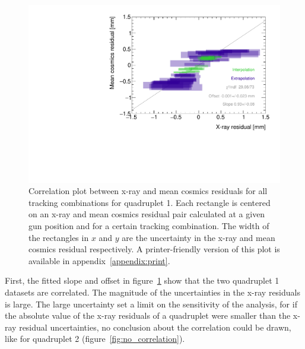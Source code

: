 \begin{figure}
    \centering
    \includegraphics[width = \textwidth]{figures/figure_QL2P11_3100V_2021-08-05_QL2P11_local_cosmic_and_xray_data_correlation_plot.pdf}
    \caption{Correlation plot between x-ray and mean cosmics residuals for all tracking combinations for quadruplet 1. Each rectangle is centered on an x-ray and mean cosmics residual pair calculated at a given gun position and for a certain tracking combination. The width of the rectangles in $x$ and $y$ are the uncertainty in the x-ray and mean cosmics residual respectively. A printer-friendly version of this plot is available in appendix~\ref{appendix:print}.}
    \label{fig:correlation}
\end{figure}

First, the fitted slope and offset in figure~\ref{fig:correlation} show that the two quadruplet 1 datasets are correlated. The magnitude of the uncertainties in the x-ray residuals is large. The large uncertainty set a limit on the sensitivity of the analysis, for if the absolute value of the x-ray residuals of a quadruplet were smaller than the x-ray residual uncertainties, no conclusion about the correlation could be drawn, like for quadruplet 2 (figure~\ref{fig:no_correlation}). 

